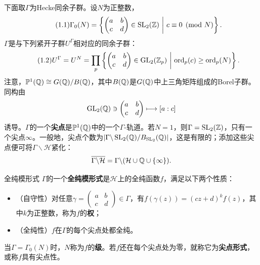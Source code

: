 下面取$\Gamma$为Hecke同余子群。设$N$为正整数，
\begin{equation}\tag{1.1}\label{L6eq11}
\Gamma_0(N)=\left\{\begin{pmatrix}a&b\\c&d\end{pmatrix}\in\SL_2(\Z)\ \middle|\ c\equiv0\pmod N\right\}.
\end{equation}
$\Gamma$是与下列紧开子群$U^\Gamma$相对应的同余子群：
\begin{equation}\tag{1.2}\label{L6eq12}
U^\Gamma=U^N=\prod_p\left\{\begin{pmatrix}a&b\\c&d\end{pmatrix}\in\GL_2(\Z_p)\ \middle|\ \ord_p(c)\geq\ord_p(N)\right\}.
\end{equation}
注意，$\mathbb P^1(\mathbb{Q})\cong G(\mathbb{Q})/B(\mathbb{Q})$，其中$B(\mathbb{Q})$是$G(\mathbb{Q})$中上三角矩阵组成的Borel子群。
同构由
\[\operatorname{GL}_2(\mathbb{Q})\ni\begin{pmatrix}a&b\\c&d\end{pmatrix}\longmapsto[a:c]\]
诱导。$\Gamma$的一个\textbf{尖点}是$\mathbb P^1(\mathbb{Q})$中的一个$\Gamma$-轨道。若$N=1$，则$\Gamma=\operatorname{SL}_2(\mathbb{Z})$，只有一个尖点$\infty$。一般地，尖点个数为$|\Gamma\backslash\operatorname{SL}_2(\mathbb{Q})/B_{\operatorname{SL}_2}(\mathbb{Q})|$，这是有限的；添加这些尖点便可将$\Gamma\backslash\mathcal H$紧化：
\[\overline{\Gamma\backslash\mathcal H}=\Gamma\backslash(\mathcal H\cup\mathbb{Q}\cup\{\infty\}).\]
\begin{definition}{全纯模形式}\label{L6S1O1}
$\Gamma$的一个\textbf{全纯模形式}是$\mathcal H$上的全纯函数$f$，满足以下两个性质：
\begin{itemize}
\item （自守性）对任意$\gamma=\begin{pmatrix}a&b\\c&d\end{pmatrix}\in\Gamma$，有$f(\gamma(z))=(cz+d)^k f(z)$，其中$k$为正整数，称为$f$的\textbf{权}；
\item （全纯性）$f$在$\Gamma$的每个尖点处都全纯。
\end{itemize}
当$\Gamma=\Gamma_0(N)$时，$N$称为$f$的\textbf{级}。若$f$还在每个尖点处为零，就称它为\textbf{尖点形式}，或称$f$具有尖点性。
\end{definition}
